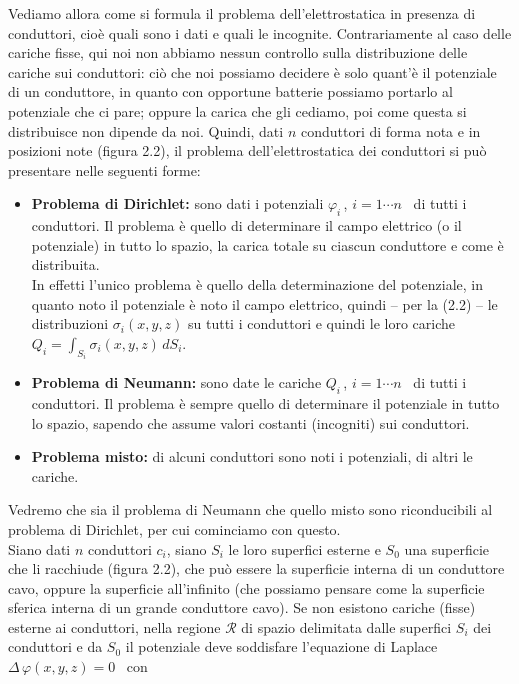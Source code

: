 Vediamo allora come si formula il problema dell'elettrostatica in presenza di
conduttori, cio\`e quali sono i dati e quali le incognite. Contrariamente al
caso delle cariche fisse, qui noi non abbiamo nessun controllo sulla
distribuzione delle cariche sui conduttori:
ci\`o che noi possiamo decidere \`e solo quant'\`e il potenziale di un
conduttore, in quanto con opportune batterie possiamo portarlo al potenziale che
ci pare; oppure la carica che gli cediamo, poi come questa si distribuisce non
dipende da noi. Quindi, dati $n$ conduttori di forma nota e in posizioni note
(figura 2.2), il problema dell'elettrostatica dei conduttori si pu\`o presentare
nelle seguenti forme:
\begin{itemize}
  \item[i)] \textbf{Problema di Dirichlet:} sono dati i potenziali
    $\varphi_i$\,, $i=1\cdots n$ \ di tutti i conduttori. Il problema \`e quello
    di determinare il campo elettrico (o il potenziale) in tutto lo spazio, la
    carica totale su ciascun conduttore e come \`e distribuita.\\
    In effetti l'unico problema \`e quello della determinazione del potenziale,
    in quanto noto il potenziale \`e noto il campo elettrico, quindi -- per la
    (2.2) -- le distribuzioni $\sigma_i(x,y,z)$ su tutti i conduttori e quindi
    le loro cariche $Q_i=\int_{S_i}\sigma_i(x,y,z)\,dS_i$.
  \item[ii)] \textbf{Problema di Neumann:} sono date le cariche $Q_i$\,,
    $i=1\cdots n$ \ di tutti i conduttori. Il problema \`e sempre quello di
    determinare il potenziale in tutto lo spazio, sapendo che assume valori
    costanti (incogniti) sui conduttori.
  \item[iii)] \textbf{Problema misto:} di alcuni conduttori sono noti i
    potenziali, di altri le cariche.
\end{itemize}
Vedremo che sia il problema di Neumann che quello misto sono riconducibili al
problema di Dirichlet, per cui cominciamo con questo.\\
Siano dati $n$ conduttori $c_i$, siano $S_i$ le loro superfici esterne e $S_0$
una superficie che li racchiude (figura 2.2), che pu\`o essere la superficie
interna di un conduttore cavo, oppure la superficie all'infinito (che possiamo
pensare come la superficie sferica interna di un grande conduttore cavo). Se non
esistono cariche (fisse) esterne ai conduttori, nella regione $\mathcal R$ di
spazio delimitata dalle superfici $S_i$ dei conduttori e da $S_0$ il potenziale
deve soddisfare l'equazione di Laplace \ $\Delta\,\varphi(x,y,z)=0$ \ con

